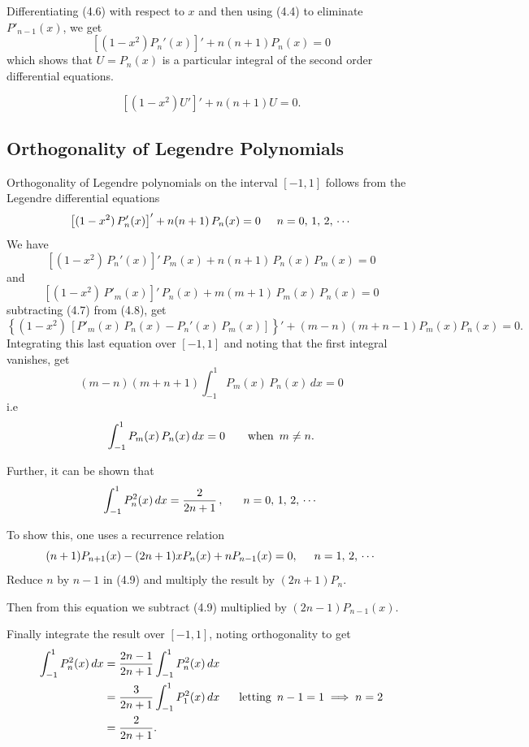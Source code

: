 \documentclass[12pt,a4paper]{report}
\theoremstyle{definition}
\theoremstyle{plain}
\begin{document}
Differentiating (4.6) with respect to $x$ and then using (4.4) to eliminate $P'_{n-1}(x)$, we get
$$\left[(1-x^2)P_n'(x)\right]' + n(n+1) P_n(x) = 0$$
which shows that $U=P_n(x)$ is a particular integral of the second order differential equations.

$$\left[(1-x^2)U'\right]' + n(n+1) U = 0.$$


\subsection{Orthogonality of Legendre Polynomials}
Orthogonality of Legendre polynomials on the interval $[-1,1]$ follows from the Legendre differential equations 
$$\left[(1-x^2)\, P'_n(x) \right]' + n(n+1)\, P_n(x) = 0\hspace{0.5cm} n = 0,\, 1, \, 2,\, \cdots$$ 
We have
\begin{equation}
\left[(1 - x^2)\, P_n'(x)\right]'\, P_m(x) + n(n+1)\, P_n(x)\, P_m(x) = 0
\end{equation}
and 
\begin{equation}
\left[(1-x^2)\, P'_m(x)\right]'\, P_n(x) + m(m+1)\, P_m(x)\, P_n(x) = 0
\end{equation}
subtracting (4.7) from (4.8), get
$$\left\{(1-x^2)\, \left[P'_m(x)\, P_n(x) - P_n'(x)\, P_m(x)\right]\right\}' + (m-n)(m+n-1)P_m(x)P_n(x) = 0.$$
Integrating this last equation over $[-1,1]$ and noting that the first integral vanishes, get
$$(m-n)(m+n+1)\int_{-1}^1P_m(x)\, P_n(x)\, dx = 0$$
i.e 
$$\int_{-1}^1P_m(x)\, P_n(x)\, dx = 0 \hspace{0.7cm} \text{when}\,\,\, m\neq n.$$

Further, it can be shown that
$$\int_{-1}^1P_n^2(x)\, dx = \frac{2}{2n + 1}\, , \hspace{0.6cm} n = 0, \, 1, \, 2, \, \cdots$$


To show this, one uses a recurrence relation
\begin{equation}
(n+1)P_{n+1}(x) - (2n+1)xP_n(x) + nP_{n-1}(x) = 0, \hspace{0.5cm} n = 1, \, 2,\, \cdots 
\end{equation}
Reduce $n$ by $n-1$ in (4.9) and multiply the result by $(2n+1)P_n$.

Then from this equation we subtract (4.9) multiplied by $(2n-1)P_{n-1}(x)$.

Finally integrate the result over $[-1,1]$, noting orthogonality to get 
\begin{align*}
\int_{-1}^1P_n^2(x)\, dx & = \frac{2n - 1}{2n+1}\int_{-1}^1P^2_n(x)\, dx\\
                         & = \frac{3}{2n+1}\int_{-1}^1P^2_1(x)\, dx \hspace{0.6cm} \text{letting} \,\,\, n-1 = 1 \implies n  = 2\\
                         & =\frac{2}{2n+1}.
\end{align*}
\end{document}
